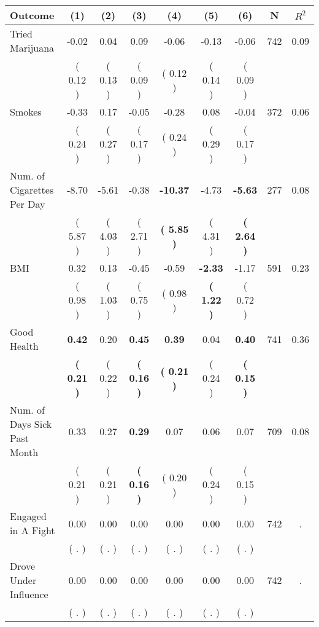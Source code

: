 \begin{tabular}{lcccccccc}
\toprule
 \textbf{Outcome} & \textbf{(1)} & \textbf{(2)} & \textbf{(3)} & \textbf{(4)} & \textbf{(5)} & \textbf{(6)} & \textbf{N} & \textbf{$ R^2$} \\
\midrule
Tried Marijuana &     -0.02 &      0.04 &      0.09 &     -0.06 &     -0.13 &     -0.06 & 742 &       0.09 \\ 
 & (     0.12 ) & (     0.13 ) & (     0.09 ) & (     0.12 ) & (     0.14 ) & (     0.09 ) & \\
Smokes &     -0.33 &      0.17 &     -0.05 &     -0.28 &      0.08 &     -0.04 & 372 &       0.06 \\ 
 & (     0.24 ) & (     0.27 ) & (     0.17 ) & (     0.24 ) & (     0.29 ) & (     0.17 ) & \\
Num. of Cigarettes Per Day &     -8.70 &     -5.61 &     -0.38 & \textbf{   -10.37} &     -4.73 & \textbf{    -5.63} & 277 &       0.08 \\ 
 & (     5.87 ) & (     4.03 ) & (     2.71 ) & \textbf{(     5.85 )} & (     4.31 ) & \textbf{(     2.64 )} & \\
BMI &      0.32 &      0.13 &     -0.45 &     -0.59 & \textbf{    -2.33} &     -1.17 & 591 &       0.23 \\ 
 & (     0.98 ) & (     1.03 ) & (     0.75 ) & (     0.98 ) & \textbf{(     1.22 )} & (     0.72 ) & \\
Good Health & \textbf{     0.42} &      0.20 & \textbf{     0.45} & \textbf{     0.39} &      0.04 & \textbf{     0.40} & 741 &       0.36 \\ 
 & \textbf{(     0.21 )} & (     0.22 ) & \textbf{(     0.16 )} & \textbf{(     0.21 )} & (     0.24 ) & \textbf{(     0.15 )} & \\
Num. of Days Sick Past Month &      0.33 &      0.27 & \textbf{     0.29} &      0.07 &      0.06 &      0.07 & 709 &       0.08 \\ 
 & (     0.21 ) & (     0.21 ) & \textbf{(     0.16 )} & (     0.20 ) & (     0.24 ) & (     0.15 ) & \\
Engaged in A Fight &      0.00 &      0.00 &      0.00 &      0.00 &      0.00 &      0.00 & 742 &          . \\ 
 & (        . ) & (        . ) & (        . ) & (        . ) & (        . ) & (        . ) & \\
Drove Under Influence &      0.00 &      0.00 &      0.00 &      0.00 &      0.00 &      0.00 & 742 &          . \\ 
 & (        . ) & (        . ) & (        . ) & (        . ) & (        . ) & (        . ) & \\

\end{tabular}
